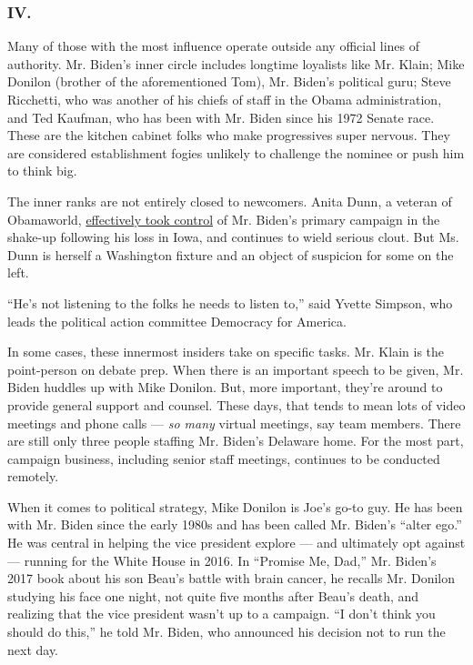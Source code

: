 \hypertarget{iv}{%
\subsubsection{IV.}\label{iv}}

Many of those with the most influence operate outside any official lines
of authority. Mr. Biden's inner circle includes longtime loyalists like
Mr. Klain; Mike Donilon (brother of the aforementioned Tom), Mr. Biden's
political guru; Steve Ricchetti, who was another of his chiefs of staff
in the Obama administration, and Ted Kaufman, who has been with Mr.
Biden since his 1972 Senate race. These are the kitchen cabinet folks
who make progressives super nervous. They are considered establishment
fogies unlikely to challenge the nominee or push him to think big.

The inner ranks are not entirely closed to newcomers. Anita Dunn, a
veteran of Obamaworld,
\href{https://www.nytimes.com/2020/02/07/us/politics/joe-biden-anita-dunn.html}{effectively
took control} of Mr. Biden's primary campaign in the shake-up following
his loss in Iowa, and continues to wield serious clout. But Ms. Dunn is
herself a Washington fixture and an object of suspicion for some on the
left.

``He's not listening to the folks he needs to listen to,'' said Yvette
Simpson, who leads the political action committee Democracy for America.

In some cases, these innermost insiders take on specific tasks. Mr.
Klain is the point-person on debate prep. When there is an important
speech to be given, Mr. Biden huddles up with Mike Donilon. But, more
important, they're around to provide general support and counsel. These
days, that tends to mean lots of video meetings and phone calls ---
\emph{so many} virtual meetings, say team members. There are still only
three people staffing Mr. Biden's Delaware home. For the most part,
campaign business, including senior staff meetings, continues to be
conducted remotely.

When it comes to political strategy, Mike Donilon is Joe's go-to guy. He
has been with Mr. Biden since the early 1980s and has been called Mr.
Biden's ``alter ego.'' He was central in helping the vice president
explore --- and ultimately opt against --- running for the White House
in 2016. In ``Promise Me, Dad,'' Mr. Biden's 2017 book about his son
Beau's battle with brain cancer, he recalls Mr. Donilon studying his
face one night, not quite five months after Beau's death, and realizing
that the vice president wasn't up to a campaign. ``I don't think you
should do this,'' he told Mr. Biden, who announced his decision not to
run the next day.

